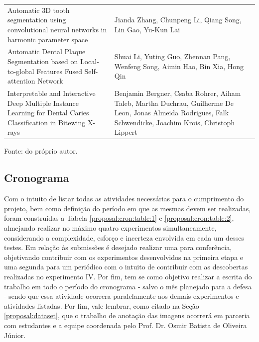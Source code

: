 \begin{table}[H]
{\begin{tabular}{l|l|l}
        Automatic 3D tooth segmentation using convolutional neural networks in harmonic parameter space                                 & Jianda Zhang, Chunpeng Li, Qiang Song, Lin Gao, Yu-Kun Lai                                                                                                                                                            &  \cite{Zhang2020}       \\
        Automatic Dental Plaque Segmentation based on Local-to-global Features Fused Self-attention Network                             & Shuai Li, Yuting Guo, Zhennan Pang, Wenfeng Song, Aimin Hao, Bin Xia, Hong Qin                                                                                                                                        &  \cite{Li2022}          \\
        Interpretable and Interactive Deep Multiple Instance Learning for Dental Caries Classification in Bitewing X-rays               & Benjamin Bergner, Csaba Rohrer, Aiham Taleb, Martha Duchrau, Guilherme De Leon, Jonas Almeida Rodrigues, Falk Schwendicke, Joachim Krois, Christoph Lippert                                                           &  \cite{Bergner2021}  
    \end{tabular}}

    \vspace*{1 cm}
    Fonte: do próprio autor.
\end{table}


\subsection{Cronograma}
\label{proposal:cron}
Com o intuito de listar todas as atividades necessárias para o cumprimento do projeto, bem como definição do período em que as mesmas devem ser realizadas, foram construídas a Tabela \ref{proposal:cron:table:1} e \ref{proposal:cron:table:2}, almejando realizar no máximo quatro  experimentos simultaneamente, considerando a complexidade, esforço e incerteza envolvida em cada um desses testes. Em relação às submissões é desejado realizar uma para conferência, objetivando  contribuir com os experimentos desenvolvidos na primeira etapa e uma segunda para um periódico com o intuito de contribuir com as descobertas realizadas no experimento IV. Por fim, tem se como objetivo realizar a escrita do trabalho em todo o período do cronograma - salvo o mês planejado para a defesa - sendo que essa atividade ocorrera paralelamente aos demais experimentos e atividades listadas. Por fim, vale lembrar, como citado na Seção \ref{proposal:dataset}, que o trabalho de anotação das imagens ocorrerá em parceria com estudantes e a equipe coordenada pelo Prof. Dr. Osmir Batista de Oliveira Júnior. 

